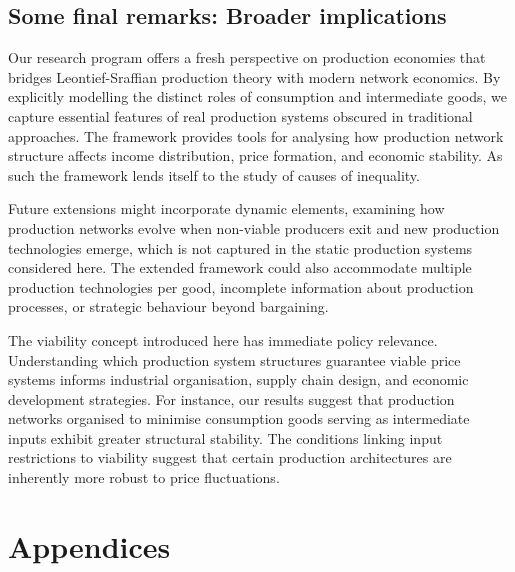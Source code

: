 \documentclass[11pt,fleqn]{article}
\begin{document}
\subsection{Some final remarks: Broader implications}

Our research program offers a fresh perspective on production economies that bridges Leontief-Sraffian production theory with modern network economics. By explicitly modelling the distinct roles of consumption and intermediate goods, we capture essential features of real production systems obscured in traditional approaches. The framework provides tools for analysing how production network structure affects income distribution, price formation, and economic stability. As such the framework lends itself to the study of causes of inequality. 

Future extensions might incorporate dynamic elements, examining how production networks evolve when non-viable producers exit and new production technologies emerge, which is not captured in the static production systems considered here. The extended framework could also accommodate multiple production technologies per good, incomplete information about production processes, or strategic behaviour beyond bargaining.

The viability concept introduced here has immediate policy relevance. Understanding which production system structures guarantee viable price systems informs industrial organisation, supply chain design, and economic development strategies. For instance, our results suggest that production networks organised to minimise consumption goods serving as intermediate inputs exhibit greater structural stability. The conditions linking input restrictions to viability suggest that certain production architectures are inherently more robust to price fluctuations.


\newpage
\singlespace



\newpage
\appendix

\section*{Appendices}
\end{document}
